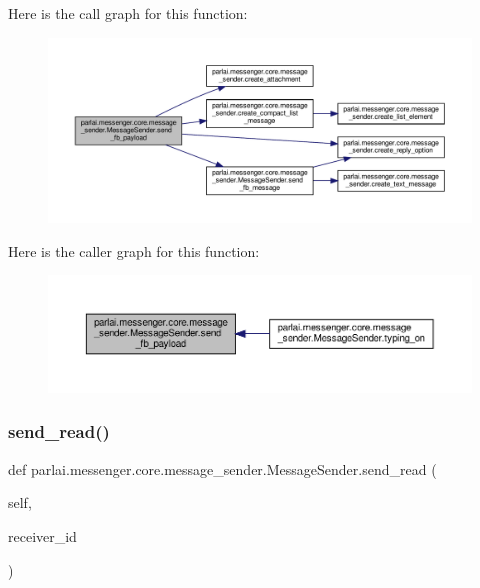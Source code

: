 Here is the call graph for this function\+:
\nopagebreak
\begin{figure}[H]
\begin{center}
\leavevmode
\includegraphics[width=350pt]{classparlai_1_1messenger_1_1core_1_1message__sender_1_1MessageSender_a8bc08e730c5d1fbe4c4cc0d96746b30a_cgraph}
\end{center}
\end{figure}
Here is the caller graph for this function\+:
\nopagebreak
\begin{figure}[H]
\begin{center}
\leavevmode
\includegraphics[width=350pt]{classparlai_1_1messenger_1_1core_1_1message__sender_1_1MessageSender_a8bc08e730c5d1fbe4c4cc0d96746b30a_icgraph}
\end{center}
\end{figure}
\mbox{\label{classparlai_1_1messenger_1_1core_1_1message__sender_1_1MessageSender_aa278e80e25fca3b45bc2d6328d08d638}} 
\subsubsection{\texorpdfstring{send\+\_\+read()}{send\_read()}}
{\footnotesize\ttfamily def parlai.\+messenger.\+core.\+message\+\_\+sender.\+Message\+Sender.\+send\+\_\+read (\begin{DoxyParamCaption}\item[{}]{self,  }\item[{}]{receiver\+\_\+id }\end{DoxyParamCaption})}



